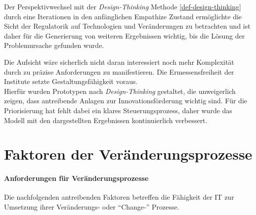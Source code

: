 Der Perspektivwechsel mit der \emph{Design-Thinking} Methode \ref{def-design-thinking} durch eine Iterationen in den anfänglichen Empathize Zustand ermöglichte die Sicht der Regulatorik auf Technologien und Veränderungen zu betrachten und ist daher für die Generierung von weiteren Ergebnissen wichtig, bis die Lösung der Problemursache gefunden wurde.

Die Aufsicht wäre sicherlich nicht daran interessiert noch mehr Komplexität durch zu präzise Anforderungen zu manifestieren. Die Ermessensfreiheit der Institute setzte Gestaltungsfähigkeit voraus.
\medskip
\\
Hierfür wurden Prototypen nach \emph{Design-Thinking} gestaltet, die unweigerlich zeigen, dass antreibende Anlagen zur Innovationsförderung wichtig sind. Für die Priorisierung hat fehlt dabei ein klares Steuerungsprozess, daher wurde das Modell mit den dargestellten Ergebnissen kontinuierlich verbessert.

\section{Faktoren der Veränderungsprozesse}
\label{section:faktoren-change}

\paragraph{Anforderungen  für Veränderungsprozesse}
Die nachfolgenden antreibenden Faktoren betreffen die Fähigkeit der IT zur Umsetzung ihrer Veränderungs- oder \enquote{Change-} Prozesse.

